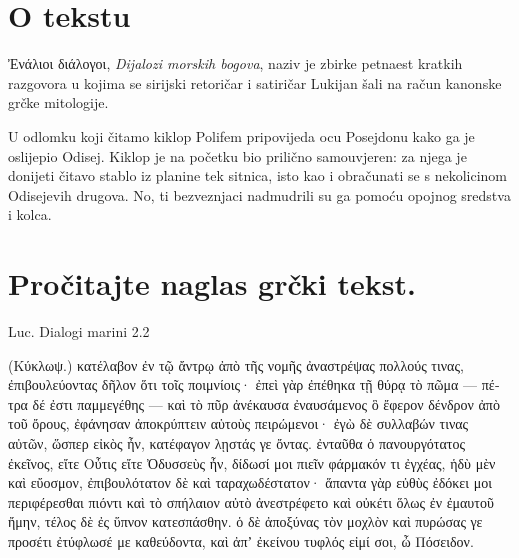 


\section*{O tekstu}

\textgreek[variant=ancient]{Ἐνάλιοι διάλογοι,} \textit{Dijalozi morskih bogova}, naziv je zbirke petnaest kratkih razgovora u kojima se sirijski retoričar i satiričar Lukijan šali na račun kanonske grčke mitologije.

U odlomku koji čitamo kiklop Polifem pripovijeda ocu Posejdonu kako ga je oslijepio Odisej. Kiklop je na početku bio prilično samouvjeren: za njega je donijeti čitavo stablo iz planine tek sitnica, isto kao i obračunati se s nekolicinom Odisejevih drugova. No, ti bezveznjaci nadmudrili su ga pomoću opojnog sredstva i kolca.



\section*{Pročitajte naglas grčki tekst.}

Luc. Dialogi marini 2.2


\medskip


{\large

\begin{greek}

\noindent (Κύκλωψ.) κατέλαβον ἐν τῷ ἄντρῳ ἀπὸ τῆς νομῆς ἀναστρέψας πολλούς τινας, ἐπιβουλεύοντας δῆλον ὅτι τοῖς ποιμνίοις· ἐπεὶ γὰρ ἐπέθηκα τῇ θύρᾳ τὸ πῶμα — πέτρα δέ ἐστι παμμεγέθης — καὶ τὸ πῦρ ἀνέκαυσα ἐναυσάμενος ὃ ἔφερον δένδρον ἀπὸ τοῦ ὄρους, ἐφάνησαν ἀποκρύπτειν αὑτοὺς πειρώμενοι· ἐγὼ δὲ συλλαβών τινας αὐτῶν, ὥσπερ εἰκὸς ἦν, κατέφαγον λῃστάς γε ὄντας. ἐνταῦθα ὁ πανουργότατος ἐκεῖνος, εἴτε Οὖτις εἴτε Ὀδυσσεὺς ἦν, δίδωσί μοι πιεῖν φάρμακόν τι ἐγχέας, ἡδὺ μὲν καὶ εὔοσμον, ἐπιβουλότατον δὲ καὶ ταραχωδέστατον· ἅπαντα γὰρ εὐθὺς ἐδόκει μοι περιφέρεσθαι πιόντι καὶ τὸ σπήλαιον αὐτὸ ἀνεστρέφετο καὶ οὐκέτι ὅλως ἐν ἐμαυτοῦ ἤμην, τέλος δὲ ἐς ὕπνον κατεσπάσθην. ὁ δὲ ἀποξύνας τὸν μοχλὸν καὶ πυρώσας γε προσέτι ἐτύφλωσέ με καθεύδοντα, καὶ ἀπʼ ἐκείνου τυφλός εἰμί σοι, ὦ Πόσειδον.


\end{greek}

}


